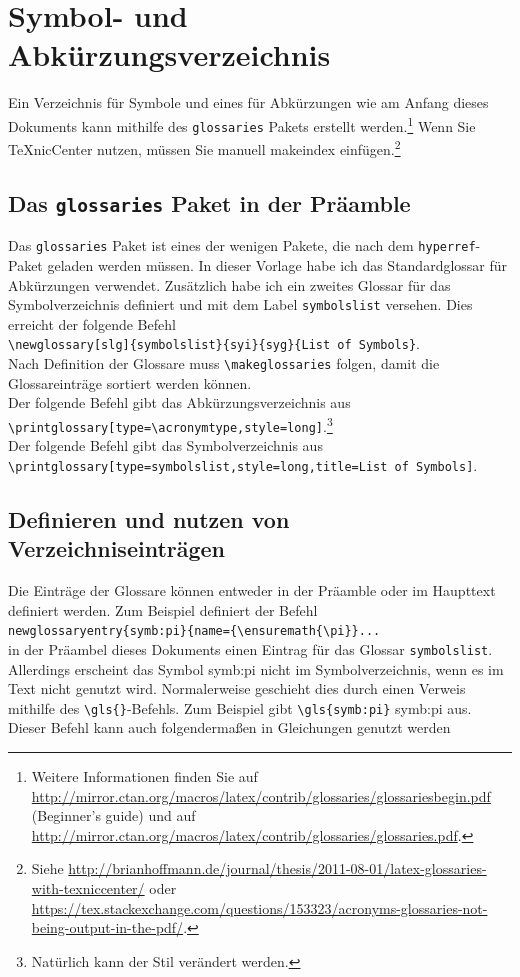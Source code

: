 \documentclass[a4paper,12pt]{scrartcl} %
\begin{document}
\section{Symbol- und Abkürzungsverzeichnis}
Ein Verzeichnis für Symbole und eines für Abkürzungen wie am Anfang dieses Dokuments kann mithilfe des \texttt{glossaries} Pakets erstellt werden.\footnote{Weitere Informationen finden Sie auf \url{http://mirror.ctan.org/macros/latex/contrib/glossaries/glossariesbegin.pdf} (Beginner's guide) und auf \url{http://mirror.ctan.org/macros/latex/contrib/glossaries/glossaries.pdf}.} Wenn Sie TeXnicCenter nutzen, müssen Sie manuell makeindex einfügen.\footnote{Siehe \url{http://brianhoffmann.de/journal/thesis/2011-08-01/latex-glossaries-with-texniccenter/} oder \url{https://tex.stackexchange.com/questions/153323/acronyms-glossaries-not-being-output-in-the-pdf/}.}

\subsection{Das \texttt{glossaries} Paket in der Präamble}
Das \texttt{glossaries} Paket ist eines der wenigen Pakete, die nach dem \texttt{hyperref}-Paket geladen werden müssen. In dieser Vorlage habe ich das Standardglossar für Abkürzungen verwendet. Zusätzlich habe ich ein zweites Glossar für das Symbolverzeichnis definiert und mit dem Label \texttt{symbolslist} versehen. Dies erreicht der folgende Befehl\\
\verb|\newglossary[slg]{symbolslist}{syi}{syg}{List of Symbols}|.\\

Nach Definition der Glossare muss \verb|\makeglossaries| folgen, damit die Glossareinträge sortiert werden können.\\

Der folgende Befehl gibt das Abkürzungsverzeichnis aus\\
\verb|\printglossary[type=\acronymtype,style=long]|.\footnote{Natürlich kann der Stil verändert werden.}\\
Der folgende Befehl gibt das Symbolverzeichnis aus\\
\verb|\printglossary[type=symbolslist,style=long,title=List of Symbols]|.

\subsection{Definieren und nutzen von Verzeichniseinträgen}
Die Einträge der Glossare können entweder in der Präamble oder im Haupttext definiert werden. Zum Beispiel definiert der Befehl\\
\verb|newglossaryentry{symb:pi}{name={\ensuremath{\pi}}...|\\
in der Präambel dieses Dokuments einen Eintrag für das Glossar \texttt{symbolslist}. Allerdings erscheint das Symbol \gls{symb:pi} nicht im Symbolverzeichnis, wenn es im Text nicht genutzt wird. Normalerweise geschieht dies durch einen Verweis mithilfe des \verb|\gls{}|-Befehls. Zum Beispiel gibt \verb|\gls{symb:pi}| \gls{symb:pi} aus. Dieser Befehl kann auch folgendermaßen in Gleichungen genutzt werden
\end{document}
